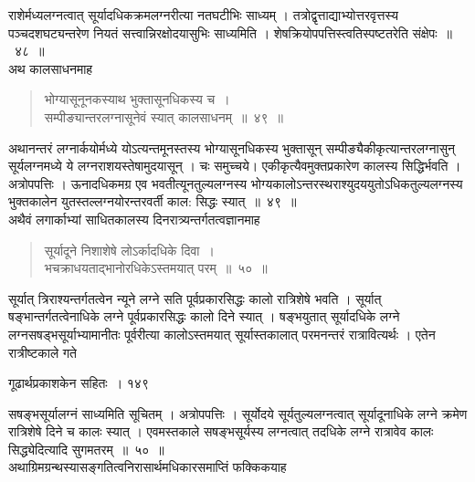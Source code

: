 \documentclass[11pt, openany]{book}
\begin{document}
\begin{sloppypar}
\noindent राशेर्मध्यलग्नत्वात् सूर्यादधिकक्रमलग्नरीत्या नतघटीभिः साध्यम् । तत्रोद्वृत्ताद्याभ्योत्तरवृत्तस्य पञ्चदशघट्यन्तरेण नियतं सत्त्वान्निरक्षोदयासुभिः साध्यमिति । शेषक्रियोपपत्तिस्त्वतिस्पष्टतरेति संक्षेपः~॥~४८~॥\\
\noindent अथ कालसाधनमाह\textendash
\end{sloppypar}


\begin{quote}
  {\ssi भोग्यासूनूनकस्याथ भुक्तासूनधिकस्य च~।\\
सम्पीङ्यान्तरलग्नासूनेवं स्यात् कालसाधनम्~॥~४९~॥}
\end{quote}

\begin{sloppypar}
 अथानन्तरं लग्नार्कयोर्मध्ये योऽत्यन्तमूनस्तस्य भोग्यासूनधिकस्य भुक्तासून् सम्पीङ्यैकीकृत्यान्तरलग्नासुन् सूर्यलग्नमध्ये ये लग्नराशयस्तेषामुदयासून् । चः समुच्चये। एकीकृत्यैवमुक्तप्रकारेण कालस्य सिद्धिर्भवति । अत्रोपपत्तिः । ऊनादधिकमग्र एव भवतीत्यूनतुल्यलग्नस्य भोग्यकालोऽन्तरस्थराश्युदययुतोऽधिकतुल्यलग्नस्य भुक्तकालेन युतस्तल्लग्नयोरन्तरवर्ती काल: सिद्धः स्यात्~॥~४९~॥\\
\noindent अथैवं लगार्काभ्यां साधितकालस्य दिनरात्र्यन्तर्गतत्वज्ञानमाह\textendash
\end{sloppypar}


\begin{quote}
  {\ssi सूर्यादूने निशाशेषे लोऽर्कादधिके दिवा~।\\
भचक्राधयताद्भानोरधिकेऽस्तमयात् परम्~॥~५०~॥}
\end{quote}

\begin{sloppypar}
 सूर्यात् त्रिराश्यन्तर्गतत्वेन न्यूने लग्ने सति पूर्वप्रकारसिद्धः कालो रात्रिशेषे भवति । सूर्यात् षङ्भान्तर्गतत्वेनाधिके लग्ने पूर्वप्रकारसिद्धः कालो दिने स्यात् । षङ्भयुतात् सूर्यादधिके लग्ने लग्नसषड्भसूर्याभ्यामानीतः पूर्वरीत्या कालोऽस्तमयात् सूर्यास्तकालात् परमनन्तरं रात्रावित्यर्थः । एतेन रात्रीष्टकाले गते
\end{sloppypar}

\newpage

 \hspace{3cm} गूढार्थप्रकाशकेन सहितः~। \hfill १४९
\vspace{1cm}

\begin{sloppypar}
\noindent सषङ्भसूर्यालग्नं साध्यमिति सूचितम् । अत्रोपपत्तिः । सूर्योदये सूर्यतुल्यलग्नत्वात् सूर्यादूनाधिके लग्ने क्रमेण रात्रिशेषे दिने च कालः स्यात् । एवमस्तकाले सषङ्भसूर्यस्य लग्नत्वात् तदधिके लग्ने रात्रावेव कालः सिद्ध्येदित्यादि सुगमतरम्~॥~५०~॥\\
\noindent अथाग्रिमग्रन्थस्यासङ्गतित्वनिरासार्थमधिकारसमाप्तिं फक्किकयाह\textendash
\end{sloppypar}
\vspace{4mm}
\end{document}
